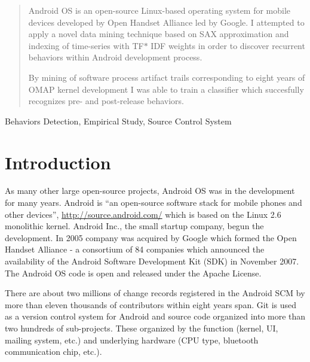 \documentclass[10pt, conference, compsocconf]{IEEEtran}
\begin{document}
\maketitle


\begin{abstract}
Android OS is an open-source Linux-based operating system for mobile devices developed by 
Open Handset Alliance led by Google. I attempted to apply a novel data mining technique 
based on SAX approximation and indexing of time-series with TF$\ast$ IDF weights in order to
discover recurrent behaviors within Android development process. 

By mining of software process artifact trails corresponding to eight years of OMAP kernel 
development I was able to train a classifier which succesfully recognizes pre- and 
post-release behaviors.
\end{abstract}

\begin{IEEEkeywords}
Behaviors Detection, Empirical Study, Source Control System

\end{IEEEkeywords}


%
\IEEEpeerreviewmaketitle



\section{Introduction}
As many other large open-source projects, Android OS was in the development for many years. 
Android is ``an open-source software stack for mobile phones and other devices'',
\url{http://source.android.com/} which is based on the Linux 2.6 monolithic kernel.
Android Inc., the small startup company, begun the development. In 2005 company was 
acquired by Google which formed the Open Handset Alliance - a consortium of 84 companies 
which announced the availability of the Android Software Development Kit (SDK) 
in November 2007. The Android OS code is open and released under the Apache License.

There are about two millions of change records registered in the Android SCM by more than 
eleven thousands of contributors within eight years span. Git is used as a version control
system for Android and source code organized into more than two hundreds of sub-projects.
These organized by the function (kernel, UI, mailing system, etc.) and underlying hardware 
(CPU type, bluetooth communication chip, etc.). 
\end{document}
